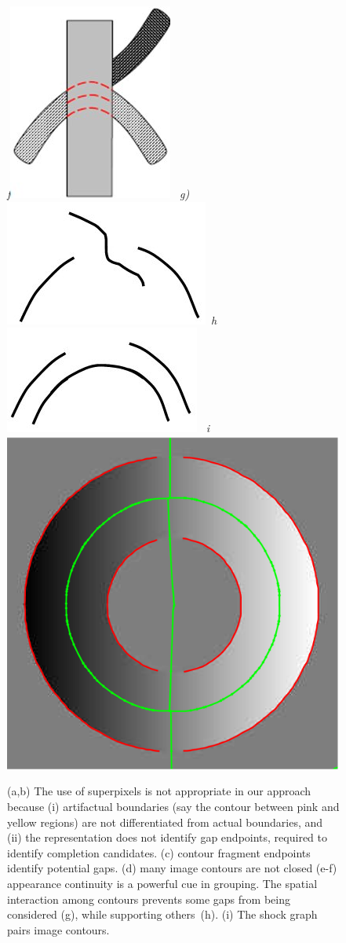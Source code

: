 \begin{figure}[!h]
{{%
{\footnotesize\textit{f}}\includegraphics[height=0.15\linewidth]{figs/figural-continuity-2.jpg}
}
\hbox{
{\footnotesize\textit{g)}}\includegraphics[height=0.1\linewidth]{figs/good-continuation-3.jpg}
{\footnotesize\textit{h}}\includegraphics[height=0.1\linewidth]{figs/good-continuation-4.jpg}
}
}
{\footnotesize\textit{i}}\includegraphics[width=0.23\linewidth]{figs/torus_contours_shocks.pdf}
  \caption{\FigureFont (a,b) The use of superpixels is not appropriate in our
approach because (i) artifactual boundaries (say the contour between pink
and yellow regions) are not differentiated from actual boundaries,   and
(ii) the representation does not identify gap endpoints,  required to identify completion candidates. (c) contour fragment endpoints identify potential gaps. (d) many image contours are not closed (e-f)
appearance continuity is a powerful cue in grouping. The spatial interaction
among contours prevents some gaps from being considered (g), while supporting
others\ (h). (i) The shock graph pairs image contours. }
 \label{figure:combinatorial:possibilities}
 \end{figure}

